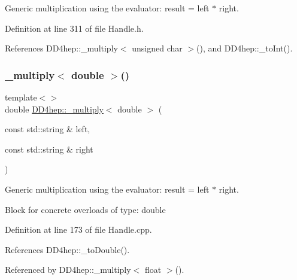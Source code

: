 Generic multiplication using the evaluator\+: result = left $\ast$ right. 



Definition at line 311 of file Handle.\+h.



References D\+D4hep\+::\+\_\+multiply$<$ unsigned char $>$(), and D\+D4hep\+::\+\_\+to\+Int().

\hypertarget{group___d_d4_h_e_p___g_e_o_m_e_t_r_y_ga39814ce821031db89d1f61da38e09580}{}\label{group___d_d4_h_e_p___g_e_o_m_e_t_r_y_ga39814ce821031db89d1f61da38e09580} 
\subsubsection{\texorpdfstring{\+\_\+multiply$<$ double $>$()}{\_multiply< double >()}\hspace{0.1cm}{\footnotesize\ttfamily [1/3]}}
{\footnotesize\ttfamily template$<$$>$ \\
double \hyperlink{group___d_d4_h_e_p___g_e_o_m_e_t_r_y_gab860c2299e2eb50e537c5079fb0c9c51}{D\+D4hep\+::\+\_\+multiply}$<$ double $>$ (\begin{DoxyParamCaption}\item[{const std\+::string \&}]{left,  }\item[{const std\+::string \&}]{right }\end{DoxyParamCaption})}



Generic multiplication using the evaluator\+: result = left $\ast$ right. 

Block for concrete overloads of type\+: double 

Definition at line 173 of file Handle.\+cpp.



References D\+D4hep\+::\+\_\+to\+Double().



Referenced by D\+D4hep\+::\+\_\+multiply$<$ float $>$().

\hypertarget{group___d_d4_h_e_p___g_e_o_m_e_t_r_y_ga71cbe44a7c57c0fc3111353f928a0f8d}{}\label{group___d_d4_h_e_p___g_e_o_m_e_t_r_y_ga71cbe44a7c57c0fc3111353f928a0f8d} 
